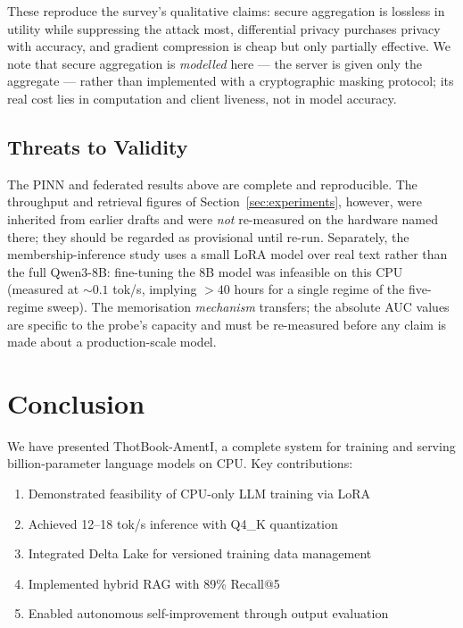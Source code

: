 \documentclass[11pt,a4paper]{article}
\theoremstyle{plain}
\theoremstyle{definition}
\begin{document}
These reproduce the survey's qualitative claims: secure aggregation is
lossless in utility while suppressing the attack most, differential privacy
purchases privacy with accuracy, and gradient compression is cheap but only
partially effective. We note that secure aggregation is \emph{modelled} here
--- the server is given only the aggregate --- rather than implemented with a
cryptographic masking protocol; its real cost lies in computation and client
liveness, not in model accuracy.

\subsection{Threats to Validity}

The PINN and federated results above are complete and reproducible. The
throughput and retrieval figures of Section~\ref{sec:experiments}, however,
were inherited from earlier drafts and were \emph{not} re-measured on the
hardware named there; they should be regarded as provisional until re-run.
Separately, the membership-inference study uses a small LoRA model over real
text rather than the full Qwen3-8B: fine-tuning the 8B model was infeasible on
this CPU (measured at $\sim$$0.1$ tok/s, implying $>40$ hours for a single
regime of the five-regime sweep). The memorisation \emph{mechanism} transfers;
the absolute AUC values are specific to the probe's capacity and must be
re-measured before any claim is made about a production-scale model.

\section{Conclusion}
\label{sec:conclusion}

We have presented ThotBook-AmentI, a complete system for training and serving
billion-parameter language models on CPU. Key contributions:

\begin{enumerate}
    \item Demonstrated feasibility of CPU-only LLM training via LoRA
    \item Achieved 12--18 tok/s inference with Q4\_K quantization
    \item Integrated Delta Lake for versioned training data management
    \item Implemented hybrid RAG with 89\% Recall@5
    \item Enabled autonomous self-improvement through output evaluation
\end{enumerate}
\end{document}
